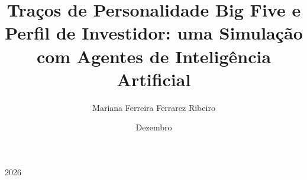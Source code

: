\documentclass{projetofinal-dcc}
\begin{document}
\title{Traços de Personalidade Big Five e Perfil de Investidor: uma Simulação com Agentes de Inteligência Artificial}

\author{Mariana Ferreira Ferrarez Ribeiro}{}





\date{Dezembro}{2026}
\maketitle

\startdocument
\makethankspage

\begin{abstract}{
  
}
\end{abstract}

\begin{englishabstract}{
  
}
\end{englishabstract}

\makefigurespage
{}
\listofquadros
\pagebreak
\maketablespage
\end{document}
